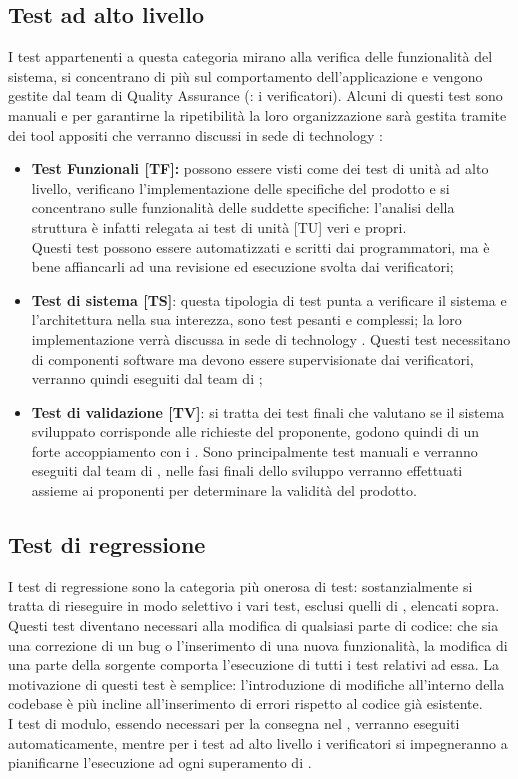 \documentclass[PianoDiProgetto.tex]{subfiles}
\begin{document}
\subsection{Test ad alto livello}
I test appartenenti a questa categoria mirano alla verifica delle funzionalità del sistema, si concentrano di più sul comportamento dell'applicazione e vengono gestite dal team di Quality Assurance (: i verificatori).
Alcuni di questi test sono manuali e per garantirne la ripetibilità la loro organizzazione sarà gestita tramite dei tool appositi che verranno discussi in sede di technology :
\begin{itemize}
	\item \textbf{Test Funzionali [TF]:} possono essere visti come dei test di unità ad alto livello, verificano l'implementazione delle specifiche del prodotto e si concentrano sulle funzionalità delle suddette specifiche: l'analisi della struttura è infatti relegata ai test di unità [TU] veri e propri. \\
	Questi test possono essere automatizzati e scritti dai programmatori, ma è bene affiancarli ad una revisione ed esecuzione svolta dai verificatori;
	\item \textbf{Test di sistema [TS]}: questa tipologia di test punta a verificare il sistema e l'architettura nella sua interezza, sono test pesanti e complessi; la loro implementazione verrà discussa in sede di technology . 
	Questi test necessitano di componenti software ma devono essere supervisionate dai verificatori, verranno quindi eseguiti dal team di ;
	\item \textbf{Test di validazione [TV]}: si tratta dei test finali che valutano se il sistema sviluppato corrisponde alle richieste del proponente, godono quindi di un forte accoppiamento con i . Sono principalmente test manuali e verranno eseguiti dal team di , nelle fasi finali dello sviluppo verranno effettuati assieme ai proponenti per determinare la validità del prodotto.
\end{itemize}

\subsection{Test di regressione}
I test di regressione sono la categoria più onerosa di test: sostanzialmente si tratta di rieseguire in modo selettivo i vari test, esclusi quelli di , elencati sopra.\\
Questi test diventano necessari alla modifica di qualsiasi parte di codice: che sia una correzione di un bug o l'inserimento di una nuova funzionalità, la modifica di una parte della sorgente comporta l'esecuzione di tutti i test relativi ad essa. La motivazione di questi test è semplice: l'introduzione di modifiche all'interno della codebase è più incline all'inserimento di errori rispetto al codice già esistente.\\
I test di modulo, essendo necessari per la consegna nel , verranno eseguiti automaticamente, mentre per i test ad alto livello i verificatori si impegneranno a pianificarne l'esecuzione ad ogni superamento di .
	
\end{document}
